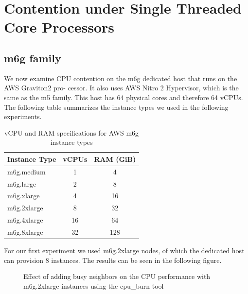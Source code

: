 \section{Contention under Single Threaded Core Processors}
\subsection{m6g family}
We now examine CPU contention on the m6g dedicated host that runs on the AWS Graviton2 pro-
cessor. It also uses AWS Nitro 2 Hypervisor, which is the same as the m5 family. This host has 
64 physical cores and therefore 64 vCPUs. The following table summarizes the instance types 
we used in the following experiments.
\begin{table}[H]
\centering
\begin{tabular}{l|c|c}
\hline
\textbf{Instance Type} & \textbf{vCPUs} & \textbf{RAM (GiB)} \\
\hline
m6g.medium   & 1  & 4   \\
m6g.large    & 2  & 8   \\
m6g.xlarge   & 4  & 16  \\
m6g.2xlarge  & 8  & 32  \\
m6g.4xlarge  & 16 & 64  \\
m6g.8xlarge  & 32 & 128 \\
\hline
\end{tabular}
\caption{vCPU and RAM specifications for AWS m6g instance types}
\label{tab:m6g_specs}
\end{table}
\noindent
For our first experiment we used m6g.2xlarge nodes, of which the dedicated host can provision 8 
instances. The results can be seen in the following figure. 
\begin{figure}[H]
\centering
{}
\caption{Effect of adding busy neighbors on the CPU performance with m6g.2xlarge instances using the cpu\_burn tool}
\end{figure}
